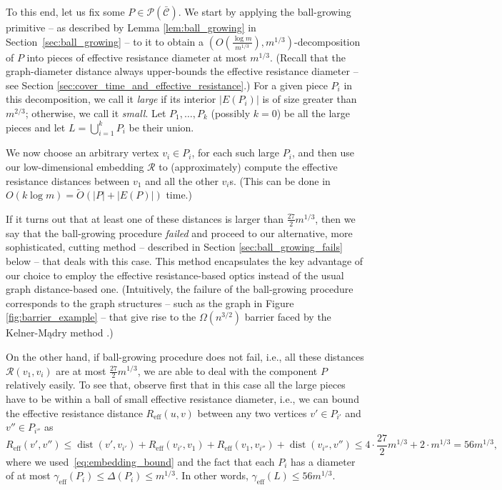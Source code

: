 \documentclass[11pt, letterpaper]{article}
\DeclareMathOperator{\dist}{dist}
\newcommand{\ocC}{\bar{\mathcal{C}}}
\newcommand{\cP}{\mathcal{P}}
\newcommand{\tO}{\widetilde{O}}
\newcommand{\Reff}{R_{\mathrm{eff}}}
\newcommand{\diameff}{\gamma_{\mathrm{eff}}}
\newcommand{\diamdist}{\Delta}
\newcommand{\cR}{\mathcal{R}}
\begin{document}
To this end, let us fix some $P \in \cP(\ocC)$. We start by applying the ball-growing primitive -- as described by Lemma \ref{lem:ball_growing} in  Section~\ref{sec:ball_growing} -- to it to obtain a $(O\left(\frac{\log m}{m^{1/3}}\right),m^{1/3})$-decomposition of $P$ into pieces of effective resistance diameter at most $m^{1/3}$. (Recall that the graph-diameter distance always upper-bounds the effective resistance diameter -- see Section \ref{sec:cover_time_and_effective_resistance}.) For a given piece $P_i$ in this decomposition, we call it {\em large} if its interior $|E(P_i)|$ is of size greater than $m^{2/3}$; otherwise,  we call it \emph{small}. Let $P_1, \dots, P_k$ (possibly $k=0$) be all the large pieces and let $L = \bigcup_{i=1}^k P_i$ be their union. 

We now choose an arbitrary vertex $v_i\in P_i$, for each such large $P_i$, and then use our low-dimensional embedding $\cR$ to (approximately) compute the effective resistance distances between $v_1$ and all the other $v_i$s. (This can be done in $O(k \log m)=\tO(|P|+|E(P)|)$ time.) 

If it turns out that at least one of these distances is larger than $\frac {27}{2} m^{1/3}$, then we say that the ball-growing procedure {\em failed} and proceed to our alternative, more sophisticated, cutting method -- described in Section \ref{sec:ball_growing_fails} below -- that deals with this case. This method encapsulates the key advantage of our choice to employ the effective resistance-based optics instead of the usual graph distance-based one. (Intuitively, the failure of the ball-growing procedure corresponds to the graph structures -- such as the graph in Figure \ref{fig:barrier_example} -- that give rise to the $\Omega(n^{3/2})$ barrier faced by the Kelner-Mądry method \cite{KelnerM09}.)

On the other hand, if ball-growing procedure does not fail, i.e., all these distances $\cR(v_1,v_i)$ are at most $\frac {27}{2} m^{1/3}$, we are able to deal with the component $P$ relatively easily. To see that, observe first that in this case all the large pieces have to be within a ball of small effective resistance diameter, i.e., we can bound the effective resistance distance $\Reff(u,v)$ between any two vertices $v'\in P_{i'}$ and $v''\in P_{i''}$ as 
\begin{equation}\label{eq:bound_diam_large_pieces}
\Reff(v',v'')\leq \dist(v',v_{i'})+\Reff(v_{i'},v_1)+\Reff(v_1,v_{i''})+\dist(v_{i''},v'')\leq 4\cdot \frac{27}{2} m^{1/3} + 2\cdot m^{1/3} = 56m^{1/3},
\end{equation}
where we used~\eqref{eq:embedding_bound} and the fact that each $P_i$ has a diameter of at most $\diameff(P_i)\leq \diamdist(P_i)\leq m^{1/3}$. In other words, $\diameff(L)\leq 56 m^{1/3}$.
\end{document}
